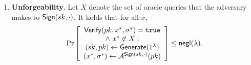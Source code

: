 \documentclass[12pt]{article}
\begin{document}
\begin{definition}
\begin{enumerate}
    \item \textbf{Unforgeability}. Let $X$ denote the set of oracle queries that the adversary makes to $\mathsf{Sign}(sk, \cdot)$. It holds that for all $x$,
    \begin{align*}
        \Pr\left[
        \begin{array}{ccc}
            \begin{matrix}
                \mathsf{Verify}(pk, x^*, \sigma^*) = \mathtt{true} \\
                \land\ x^* \not\in X: \\
                (sk, pk) \gets \mathsf{Generate}(1^\lambda) \\
                (x^*, \sigma^*) \gets \mathcal{A}^{\mathsf{Sign}(sk, \cdot)}(pk) \\
            \end{matrix} \\
        \end{array}
        \right] \leq \mathsf{negl}(\lambda).
    \end{align*}
\end{enumerate}

\end{definition}
\end{document}
